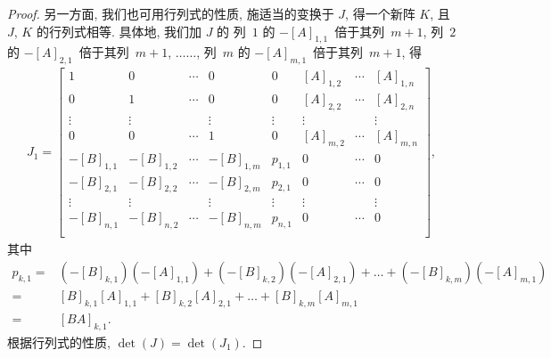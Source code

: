 \begin{proof}
    另一方面, 我们也可用行列式的性质,
    施适当的变换于 \(J\),
    得一个新阵 \(K\),
    且 \(J\), \(K\) 的行列式相等.
    具体地, 我们加 \(J\) 的%
    列~\(1\) 的 \(-[A]_{1,1}\)~倍于其列~\(m+1\),
    列~\(2\) 的 \(-[A]_{2,1}\)~倍于其列~\(m+1\),
    \(\dots \dots\),
    列~\(m\) 的 \(-[A]_{m,1}\)~倍于其列~\(m+1\),
    得
    \begin{align*}
        J_1 =
        \begin{bmatrix}
            1          & 0          & \cdots & 0          &
            0          & [A]_{1,2}  & \cdots & [A]_{1,n}    \\
            0          & 1          & \cdots & 0          &
            0          & [A]_{2,2}  & \cdots & [A]_{2,n}    \\
            \vdots     & \vdots     & {}     & \vdots     &
            \vdots     & \vdots     & {}     & \vdots       \\
            0          & 0          & \cdots & 1          &
            0          & [A]_{m,2}  & \cdots & [A]_{m,n}    \\
            -[B]_{1,1} & -[B]_{1,2} & \cdots & -[B]_{1,m} &
            p_{1,1}    & 0          & \cdots & 0            \\
            -[B]_{2,1} & -[B]_{2,2} & \cdots & -[B]_{2,m} &
            p_{2,1}    & 0          & \cdots & 0            \\
            \vdots     & \vdots     & {}     & \vdots     &
            \vdots     & \vdots     & {}     & \vdots       \\
            -[B]_{n,1} & -[B]_{n,2} & \cdots & -[B]_{n,m} &
            p_{n,1}    & 0          & \cdots & 0            \\
        \end{bmatrix},
    \end{align*}
    其中
    \begin{align*}
        p_{k,1}
        = {} &
        (-[B]_{k,1})(-[A]_{1,1})
        + (-[B]_{k,2})(-[A]_{2,1})
        + \dots
        + (-[B]_{k,m})(-[A]_{m,1})
        \\
        = {} &
        [B]_{k,1} [A]_{1,1}
        + [B]_{k,2} [A]_{2,1}
        + \dots
        + [B]_{k,m} [A]_{m,1}
        \\
        = {} &
        [BA]_{k,1}.
    \end{align*}
    根据行列式的性质,
    \(\det {(J)} = \det {(J_1)}\).


\end{proof}
